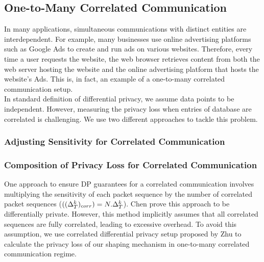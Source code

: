 \subsection{One-to-Many Correlated Communication}
In many applications,  simultaneous communications with distinct entities are interdependent.
For example, many businesses use online advertising platforms such as Google Ads to create and run ads on various websites.
Therefore, every time a user requests the website, the web browser retrieves content from both the web server hosting the website and the online advertising platform that hosts the website's Ads.   
This is, in fact, an example of a one-to-many correlated communication setup.
\\
In standard definition of differential privacy, we assume data points to be independent.  
However, measuring the privacy loss when entries of database are correlated is challenging.
We use two different approaches to tackle this problem. 
\subsubsection{Adjusting Sensitivity for Correlated Communication}


\subsubsection{Composition of Privacy Loss for Correlated Communication}


One approach to ensure DP guarantees for a correlated communication involves multiplying the sensitivity of each packet sequence by the number of correlated packet sequences (\ie $((\Delta_T^k)_{corr}) = N.\Delta_T^k$).
Chen prove this approach to be differentially private.
However, this method implicitly assumes that all correlated sequences are fully correlated, leading to excessive overhead.
To avoid this assumption, we use correlated differential privacy setup proposed by Zhu to calculate the privacy loss of our shaping mechanism in one-to-many correlated communication regime.

